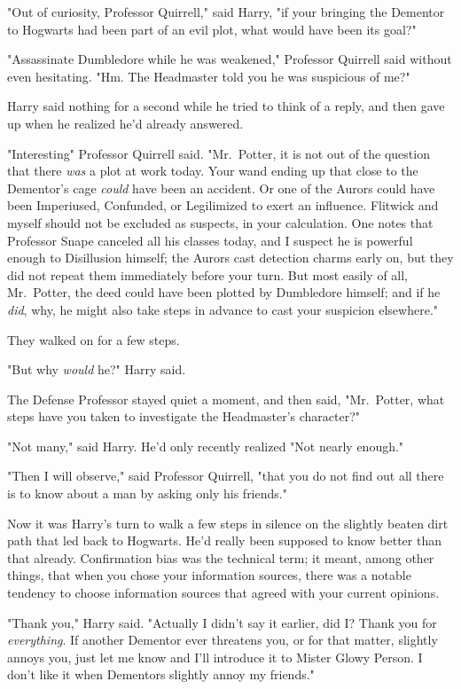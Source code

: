"Out of curiosity, Professor Quirrell," said Harry, "if your bringing the
Dementor to Hogwarts had been part of an evil plot, what would have been its
goal?"

"Assassinate Dumbledore while he was weakened," Professor Quirrell said without
even hesitating. "Hm. The Headmaster told you he was suspicious of me?"

Harry said nothing for a second while he tried to think of a reply, and then
gave up when he realized he'd already answered.

"Interesting{\el}" Professor Quirrell said. "Mr.~Potter, it is not out of
the question that there \emph{was} a plot at work today. Your wand ending up
that close to the Dementor's cage \emph{could} have been an accident. Or one of
the Aurors could have been Imperiused, Confunded, or Legilimized to exert an
influence. Flitwick and myself should not be excluded as suspects, in your
calculation. One notes that Professor Snape canceled all his classes today, and
I suspect he is powerful enough to Disillusion himself; the Aurors cast
detection charms early on, but they did not repeat them immediately before your
turn. But most easily of all, Mr.~Potter, the deed could have been plotted by
Dumbledore himself; and if he \emph{did}, why, he might also take steps in
advance to cast your suspicion elsewhere."

They walked on for a few steps.

"But why \emph{would} he?" Harry said.

The Defense Professor stayed quiet a moment, and then said, "Mr.~Potter, what
steps have you taken to investigate the Headmaster's character?"

"Not many," said Harry. He'd only recently realized{\el} "Not nearly enough."

"Then I will observe," said Professor Quirrell, "that you do not find out all
there is to know about a man by asking only his friends."

Now it was Harry's turn to walk a few steps in silence on the slightly beaten
dirt path that led back to Hogwarts. He'd really been supposed to know better
than that already. Confirmation bias was the technical term; it meant, among
other things, that when you chose your information sources, there was a notable
tendency to choose information sources that agreed with your current opinions.

"Thank you," Harry said. "Actually{\el} I didn't say it earlier, did I?
Thank you for \emph{everything}. If another Dementor ever threatens you, or for
that matter, slightly annoys you, just let me know and I'll introduce it to
Mister Glowy Person. I don't like it when Dementors slightly annoy my friends."

